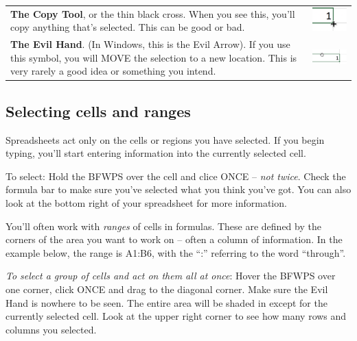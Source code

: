 \documentclass[
  letterpaper,
  DIV=11,
  numbers=noendperiod]{scrreprt}
\begin{document}
\begin{longtable}[]{@{}
  >{\raggedright\arraybackslash}p{}
  >{\raggedright\arraybackslash}p{}@{}}
\toprule()
\endhead
\textbf{The Copy Tool}, or the thin black cross. When you see this,
you'll copy anything that's selected. This can be good or bad. &
\includegraphics{./images/xl-refresher-copy.png} \\
\textbf{The Evil Hand}. (In Windows, this is the Evil Arrow). If you use
this symbol, you will MOVE the selection to a new location. This is very
rarely a good idea or something you intend. &
\includegraphics{./images/xl-refresher-evilhand.png} \\
\bottomrule()
\end{longtable}

\hypertarget{selecting-cells-and-ranges}{%
\subsection{Selecting cells and
ranges}\label{selecting-cells-and-ranges}}

Spreadsheets act only on the cells or regions you have selected. If you
begin typing, you'll start entering information into the currently
selected cell.

To select: Hold the BFWPS over the cell and clice ONCE -- \emph{not
twice}. Check the formula bar to make sure you've selected what you
think you've got. You can also look at the bottom right of your
spreadsheet for more information.

You'll often work with \emph{ranges} of cells in formulas. These are
defined by the corners of the area you want to work on -- often a column
of information. In the example below, the range is A1:B6, with the ``:''
referring to the word ``through''.

\emph{To select a group of cells and act on them all at once}: Hover the
BFWPS over one corner, click ONCE and drag to the diagonal corner. Make
sure the Evil Hand is nowhere to be seen. The entire area will be shaded
in except for the currently selected cell. Look at the upper right
corner to see how many rows and columns you selected.
\end{document}
